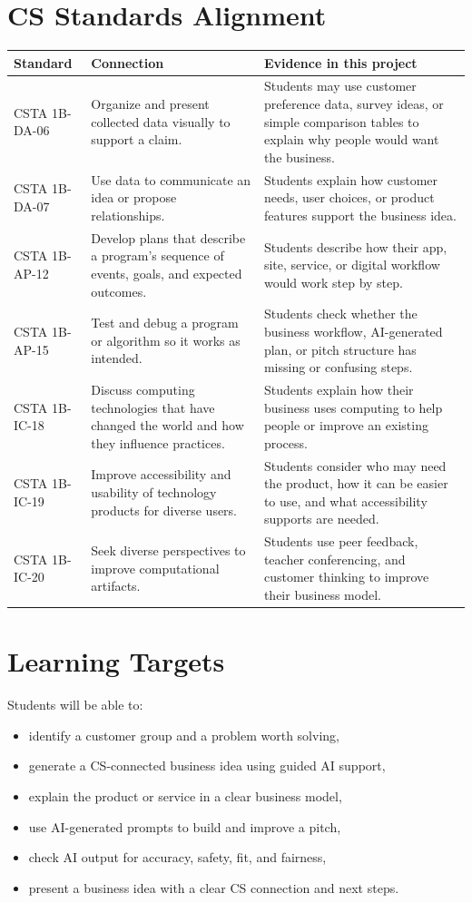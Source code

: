 \documentclass[11pt]{article}
\begin{document}
\section{CS Standards Alignment}
\begin{longtable}{>{\raggedright\arraybackslash}p{}>{\raggedright\arraybackslash}p{}>{\raggedright\arraybackslash}p{}}
\textbf{Standard} & \textbf{Connection} & \textbf{Evidence in this project} \\
\hline
CSTA 1B-DA-06 & Organize and present collected data visually to support a claim. & Students may use customer preference data, survey ideas, or simple comparison tables to explain why people would want the business. \\
CSTA 1B-DA-07 & Use data to communicate an idea or propose relationships. & Students explain how customer needs, user choices, or product features support the business idea. \\
CSTA 1B-AP-12 & Develop plans that describe a program's sequence of events, goals, and expected outcomes. & Students describe how their app, site, service, or digital workflow would work step by step. \\
CSTA 1B-AP-15 & Test and debug a program or algorithm so it works as intended. & Students check whether the business workflow, AI-generated plan, or pitch structure has missing or confusing steps. \\
CSTA 1B-IC-18 & Discuss computing technologies that have changed the world and how they influence practices. & Students explain how their business uses computing to help people or improve an existing process. \\
CSTA 1B-IC-19 & Improve accessibility and usability of technology products for diverse users. & Students consider who may need the product, how it can be easier to use, and what accessibility supports are needed. \\
CSTA 1B-IC-20 & Seek diverse perspectives to improve computational artifacts. & Students use peer feedback, teacher conferencing, and customer thinking to improve their business model. \\
\end{longtable}

\section{Learning Targets}
Students will be able to:
\begin{itemize}
  \item identify a customer group and a problem worth solving,
  \item generate a CS-connected business idea using guided AI support,
  \item explain the product or service in a clear business model,
  \item use AI-generated prompts to build and improve a pitch,
  \item check AI output for accuracy, safety, fit, and fairness,
  \item present a business idea with a clear CS connection and next steps.
\end{itemize}
\end{document}
